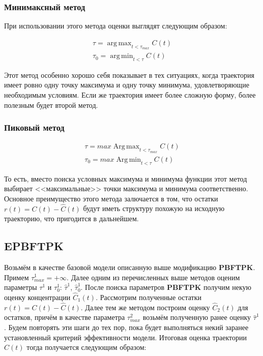 \documentclass[oneside,senior,etd]{BYUPhys}
\DeclareMathOperator*{\argmax}{arg\,max}
\DeclareMathOperator*{\argmin}{arg\,min}
\DeclareMathOperator*{\Argmax}{Arg\,max}
\DeclareMathOperator*{\Argmin}{Arg\,min}
\begin{document}
\subsubsection*{Минимаксный метод}

При использовании этого метода оценки выглядят следующим образом:

\begin{align*}
	\tau = \argmax_{t < \tau_{max}} C(t) \\
	\tau_0 = \argmin_{t < \tau} C(t)
\end{align*}

Этот метод особенно хорошо себя показывает в тех ситуациях, когда траектория имеет ровно одну точку максимума и одну точку минимума, удовлетворяющие необходимым условиям. Если же траектория имеет более сложную форму, более полезным будет второй метод.

\subsubsection*{Пиковый метод}

\begin{align*}
	\tau = max \Argmax_{t < \tau_{max}} C(t) \\
	\tau_0 = max \Argmin_{t < \tau} C(t)
\end{align*}

То есть, вместо поиска условных максимума и минимума функции этот метод выбирает <<максимальные>> точки максимума и минимума соответственно. Основное преимущество этого метода залючается в том, что остатки $r(t) = C(t) - \hat{C}(t)$ будут иметь структуру похожую на исходную траекторию, что пригодится в дальнейшем.

\subsection{EPBFTPK}

Возьмём в качестве базовой модели описанную выше модификацию \textbf{PBFTPK}. Примем $\tau_{max}^1 = +\infty$. Далее одним из перечисленных выше методов оценим параметры $\tau^1$ и $\tau_0^1$: $\hat{\tau}^1$, $\hat{\tau}_0^1$. После поиска параметров \textbf{PBFTPK} получим некую оценку концентрации $\hat{C}_1(t)$. Рассмотрим полученные остатки $r(t) = C(t) - \hat{C}(t)$. Далее тем же методом построим оценку $\hat{C}_2(t)$ для остатков, причём в качестве параметра $\tau_{max}^2$ возьмём полученную ранее оценку $\hat{\tau}^1$. Будем повторять эти шаги до тех пор, пока будет выполняться некий заранее установленный критерий эффективности модели. Итоговая оценка траектории $\hat{C}(t)$ тогда получается следующим образом:
\end{document}
